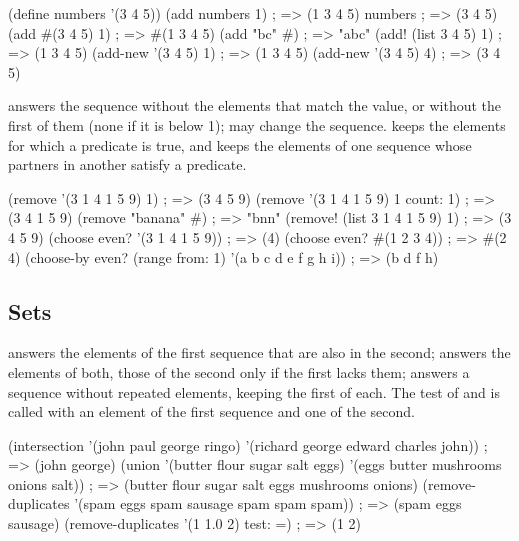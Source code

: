 \begin{dylan}
(define numbers '(3 4 5))
(add numbers 1)             ; => (1 3 4 5)
numbers                     ; => (3 4 5)
(add #(3 4 5) 1)            ; => #(1 3 4 5)
(add "bc" #\a)              ; => "abc"
(add! (list 3 4 5) 1)       ; => (1 3 4 5)
(add-new '(3 4 5) 1)        ; => (1 3 4 5)
(add-new '(3 4 5) 4)        ; => (3 4 5)
\end{dylan}

 answers the sequence
without the elements that match the value, or without the first
 of them (none if it is below 1);  may change
the sequence.
 keeps the elements for which a predicate is true, and
 keeps the elements of one sequence whose partners in
another satisfy a predicate.

\begin{dylan}
(remove '(3 1 4 1 5 9) 1)                 ; => (3 4 5 9)
(remove '(3 1 4 1 5 9) 1 count: 1)        ; => (3 4 1 5 9)
(remove "banana" #\a)                     ; => "bnn"
(remove! (list 3 1 4 1 5 9) 1)            ; => (3 4 5 9)
(choose even? '(3 1 4 1 5 9))             ; => (4)
(choose even? #(1 2 3 4))                 ; => #(2 4)
(choose-by even? (range from: 1) '(a b c d e f g h i))
; => (b d f h)
\end{dylan}

\subsection{Sets}

 answers the elements of the first sequence that are
also in the second;  answers the elements of both, those of
the second only if the first lacks them; 
answers a sequence without repeated elements, keeping the first of each.
The test of  and  is called with an
element of the first sequence and one of the second.

\begin{dylan}
(intersection '(john paul george ringo)
              '(richard george edward charles john))
; => (john george)
(union '(butter flour sugar salt eggs)
       '(eggs butter mushrooms onions salt))
; => (butter flour sugar salt eggs mushrooms onions)
(remove-duplicates '(spam eggs spam sausage spam spam spam))
; => (spam eggs sausage)
(remove-duplicates '(1 1.0 2) test: =)   ; => (1 2)
\end{dylan}


